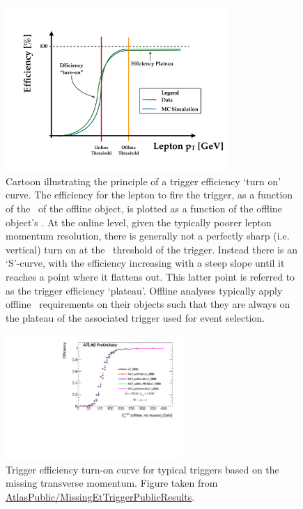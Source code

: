 \begin{figure}[!htb]
    \begin{center}
        \includegraphics[width=0.75\textwidth]{figures/common_ana/trig_plateauPDF}
        \caption{
            Cartoon illustrating the principle of a trigger efficiency `turn on' curve.
            The efficiency for the lepton to fire the trigger, as a function of the \pT~of the offline object, is plotted
            as a function of the offline object's \pT.
            At the online level, given the typically poorer lepton momentum resolution, there is generally
            not a perfectly sharp (i.e. vertical) turn on at the \pT~threshold of the trigger.
            Instead there is an `S'-curve, with the efficiency increasing with a steep slope
            until it reaches a point where it flattens out.
            This latter point is referred to as the trigger efficiency `plateau'.
            Offline analyses typically apply offline \pT~requirements on their objects
            such that they are always on the plateau of the associated trigger used for event selection.
        }
        \label{fig:trig_plateau_cartoon}
    \end{center}
\end{figure}

\begin{figure}[!htb]
    \begin{center}
        \includegraphics[width=0.6\textwidth]{figures/common_ana/trig/met_trig_example}
        \caption{
            Trigger efficiency turn-on curve for typical triggers based on the missing transverse momentum.
            Figure taken from \href{https://twiki.cern.ch/twiki/bin/view/AtlasPublic/MissingEtTriggerPublicResults}{AtlasPublic/MissingEtTriggerPublicResults}.
        }
        \label{fig:met_trig_example}
    \end{center}
\end{figure}

